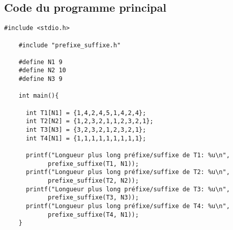 \subsection{Code du programme principal}
\begin{lstlisting}[caption={main-prefixe\_suffixe.c}]
    #include <stdio.h>

    #include "prefixe_suffixe.h"
    
    #define N1 9
    #define N2 10
    #define N3 9
    
    int main(){
    
      int T1[N1] = {1,4,2,4,5,1,4,2,4};
      int T2[N2] = {1,2,3,2,1,1,2,3,2,1};
      int T3[N3] = {3,2,3,2,1,2,3,2,1};
      int T4[N1] = {1,1,1,1,1,1,1,1,1};
    
      printf("Longueur plus long préfixe/suffixe de T1: %u\n", 
            prefixe_suffixe(T1, N1));
      printf("Longueur plus long préfixe/suffixe de T2: %u\n", 
            prefixe_suffixe(T2, N2));
      printf("Longueur plus long préfixe/suffixe de T3: %u\n", 
            prefixe_suffixe(T3, N3));
      printf("Longueur plus long préfixe/suffixe de T4: %u\n", 
            prefixe_suffixe(T4, N1));
    }
\end{lstlisting}


